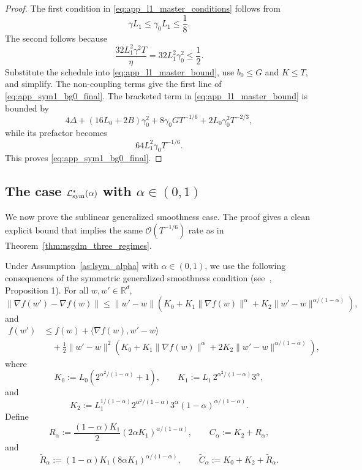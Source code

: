 \documentclass[letter,11pt]{article}
\newcommand{\R}{\mathbb{R}}
\newcommand{\Ocal}{\mathcal{O}}
\begin{document}
\begin{proof}
The first condition in \eqref{eq:app_l1_master_conditions} follows from
\[
    \gamma L_1
    \le
    \gamma_0L_1
    \le
    \frac18.
\]
The second follows because
\[
    \frac{32L_1^2\gamma^2T}{\eta}
    =
    32L_1^2\gamma_0^2
    \le
    \frac12.
\]
Substitute the schedule into \eqref{eq:app_l1_master_bound}, use
\(b_0\le G\) and \(K\le T\), and simplify. The non-coupling terms give the
first line of \eqref{eq:app_sym1_bg0_final}. The bracketed term in
\eqref{eq:app_l1_master_bound} is bounded by
\[
    4\Delta
    +(16L_0+2B)\gamma_0^2
    +8\gamma_0G T^{-1/6}
    +2L_0\gamma_0^2T^{-2/3},
\]
while its prefactor becomes
\[
    64L_1^2\gamma_0T^{-1/6}.
\]
This proves \eqref{eq:app_sym1_bg0_final}.
\end{proof}

\subsection{The case \texorpdfstring{$\mathcal L_{\rm sym}^*(\alpha)$}{Lsym alpha} with \texorpdfstring{$\alpha\in(0,1)$}{alpha in (0,1)}}
\label{app:nsgdm_alpha_case}

We now prove the sublinear generalized smoothness case. The proof gives a
clean explicit bound that implies the same \(\Ocal(T^{-1/6})\) rate as in
Theorem~\ref{thm:nsgdm_three_regimes}.

Under Assumption~\ref{as:lsym_alpha} with \(\alpha\in(0,1)\), we use the following consequences of the symmetric generalized smoothness condition (see~\citet{chen2023generalized}, Proposition 1). For
all \(w,w'\in\R^d\),
\begin{equation}
\label{eq:app_alpha_grad_diff}
\|\nabla f(w')-\nabla f(w)\|
\le
\|w'-w\|
\left(
    K_0
    +K_1\|\nabla f(w)\|^\alpha
    +K_2\|w'-w\|^{\alpha/(1-\alpha)}
\right),
\end{equation}
and
\begin{equation}
\label{eq:app_alpha_func_diff}
\begin{aligned}
    f(w')
    &\le
    f(w)+\langle\nabla f(w),w'-w\rangle \\
    &\quad
    +\frac12\|w'-w\|^2
    \left(
        K_0
        +K_1\|\nabla f(w)\|^\alpha
        +2K_2\|w'-w\|^{\alpha/(1-\alpha)}
    \right),
\end{aligned}
\end{equation}
where
\[
    K_0
    :=
    L_0\left(2^{\alpha^2/(1-\alpha)}+1\right),
    \qquad
    K_1
    :=
    L_1\,2^{\alpha^2/(1-\alpha)}3^\alpha,
\]
and
\[
    K_2
    :=
    L_1^{1/(1-\alpha)}
    2^{\alpha^2/(1-\alpha)}
    3^\alpha
    (1-\alpha)^{\alpha/(1-\alpha)}.
\]
Define
\[
    R_\alpha
    :=
    \frac{(1-\alpha)K_1}{2}
    (2\alpha K_1)^{\alpha/(1-\alpha)},
    \qquad
    C_\alpha
    :=
    K_2+R_\alpha,
\]
and
\[
    \widetilde R_\alpha
    :=
    (1-\alpha)K_1(8\alpha K_1)^{\alpha/(1-\alpha)},
    \qquad
    \widetilde C_\alpha
    :=
    K_0+K_2+\widetilde R_\alpha.
\]
\end{document}
